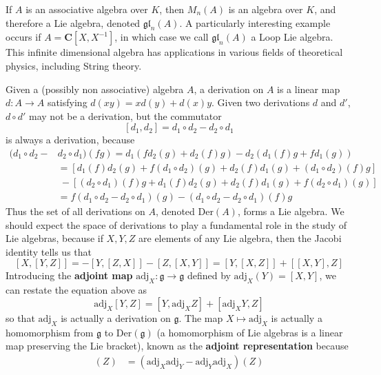 \begin{example}
    If $A$ is an associative algebra over $K$, then $M_n(A)$ is an algebra over $K$, and therefore a Lie algebra, denoted $\mathfrak{gl}_n(A)$. A particularly interesting example occurs if $A = \mathbf{C}[X,X^{-1}]$, in which case we call $\mathfrak{gl}_n(A)$ a Loop Lie algebra. This infinite dimensional algebra has applications in various fields of theoretical physics, including String theory.
\end{example}

\begin{example}
    Given a (possibly non associative) algebra $A$, a derivation on $A$ is a linear map $d: A \to A$ satisfying $d(xy) = xd(y) + d(x)y$. Given two derivations $d$ and $d'$, $d \circ d'$ may not be a derivation, but the commutator
    \[ [d_1, d_2] = d_1 \circ d_2 - d_2 \circ d_1 \]
    is always a derivation, because
    \begin{align*}
        (d_1 \circ d_2 - &d_2 \circ d_1)(fg) = d_1(f d_2(g) + d_2(f) g) - d_2(d_1(f) g + f d_1(g))\\
        &= [d_1(f) d_2(g) + f (d_1 \circ d_2)(g) + d_2(f) d_1(g) + (d_1 \circ d_2)(f) g]\\
        &\ - [(d_2 \circ d_1)(f) g + d_1(f) d_2(g) + d_2(f) d_1(g) + f (d_2 \circ d_1)(g)]\\
        &= f(d_1 \circ d_2 - d_2 \circ d_1)(g) - (d_1 \circ d_2 - d_2 \circ d_1)(f) g
    \end{align*}
    Thus the set of all derivations on $A$, denoted $\text{Der}(A)$, forms a Lie algebra. We should expect the space of derivations to play a fundamental role in the study of Lie algebras, because if $X,Y,Z$ are elements of any Lie algebra, then the Jacobi identity tells us that
    \[ [X,[Y,Z]] = - [Y,[Z,X]] - [Z,[X,Y]] = [Y,[X,Z]] + [[X,Y],Z] \]
    Introducing the {\bf adjoint map} $\text{adj}_X: \mathfrak{g} \to \mathfrak{g}$ defined by $\text{adj}_X(Y) = [X,Y]$, we can restate the equation above as
    \[ \text{adj}_X[Y,Z] = [Y, \text{adj}_X Z] + [\text{adj}_XY, Z] \]
    so that $\text{adj}_X$ is actually a derivation on $\mathfrak{g}$. The map $X \mapsto \text{adj}_X$ is actually a homomorphism from $\mathfrak{g}$ to $\text{Der}(\mathfrak{g})$ (a homomorphism of Lie algebras is a linear map preserving the Lie bracket), known as the {\bf adjoint representation} because
    \begin{align*}
        [\text{adj}_X, \text{adj}_Y](Z) &= (\text{adj}_X \text{adj}_Y - \text{adj}_Y \text{adj}_X)(Z)\\

\end{align*}
\end{example}
